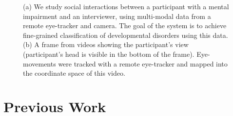 \documentclass{llncs}
\begin{document}
  \begin{figure}%
    \hfill


    \label{fig:pull_figure}
    \caption{(a) We study social interactions between a participant with a mental impairment and an interviewer, using multi-modal data from a remote eye-tracker and camera. The goal of the system is to achieve fine-grained classification of developmental disorders using this data. (b) A frame from videos showing the participant's view (participant's head is visible in the bottom of the frame). Eye-movements were tracked with a remote eye-tracker and mapped into the coordinate space of this video.
    }
  \end{figure}
  \vspace{-3em}
  \section {Previous Work}
  \vspace{-1em}
\end{document}
